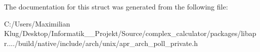 The documentation for this struct was generated from the following file\+:\begin{DoxyCompactItemize}
\item 
C\+:/\+Users/\+Maximilian Klug/\+Desktop/\+Informatik\+\_\+\_\+\+Projekt/\+Source/complex\+\_\+calculator/packages/libapr..../build/native/include/arch/unix/apr\+\_\+arch\+\_\+poll\+\_\+private.\+h\end{DoxyCompactItemize}
